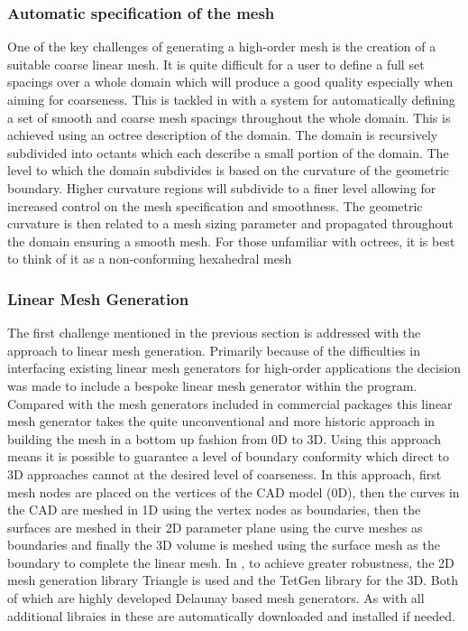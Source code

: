 \subsubsection{Automatic specification of the mesh}

One of the key challenges of generating a high-order mesh is the creation of a
suitable coarse linear mesh. It is
quite difficult for a user to define a full set spacings over a whole domain
which will produce a good quality especially when aiming for coarseness. This
is tackled in \nm with a system for automatically defining a
set of smooth and coarse mesh spacings throughout the whole domain. This is
achieved using an octree description of the domain. The domain is recursively
subdivided into octants which each describe a small portion of the domain. The
level to which the domain subdivides is based on the curvature of the geometric
boundary. Higher curvature regions will subdivide to a finer level allowing for
increased control on the mesh specification and smoothness. The geometric
curvature is then related to a mesh sizing parameter and propagated throughout
the domain ensuring a smooth mesh. For those unfamiliar with octrees, it is
best to think of it as a non-conforming hexahedral mesh

\subsubsection{Linear Mesh Generation}

The first challenge mentioned in the previous section is addressed with the
\nm approach to linear mesh generation. Primarily because of the
difficulties in interfacing existing linear mesh generators for high-order
applications the decision was made to include a bespoke linear mesh generator
within the program. Compared with the mesh generators included in commercial
packages this linear mesh generator takes the quite unconventional and more
historic approach in building the mesh in a bottom up fashion from 0D to 3D.
Using this approach means it is possible to guarantee a level of boundary
conformity which direct to 3D approaches cannot at the desired level of
coarseness. In this approach, first mesh nodes are placed on the vertices of
the CAD model (0D), then the curves in the CAD are meshed in 1D using the
vertex nodes as boundaries, then the surfaces are meshed in their 2D parameter
plane using the curve meshes as boundaries and finally the 3D volume is meshed
using the surface mesh as the boundary to complete the linear mesh. In \nm, to
achieve greater robustness, the 2D mesh generation library Triangle is used and
the TetGen library for the 3D. Both of which are highly developed Delaunay based
mesh generators. As with all additional libraies in \nekpp these are
automatically downloaded and installed if needed.

